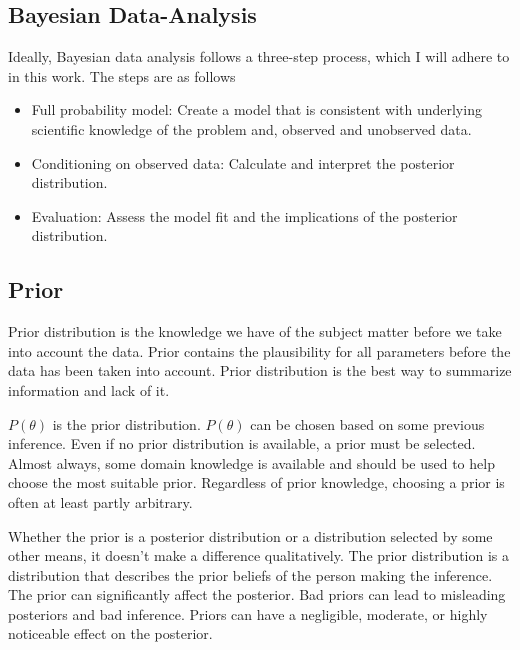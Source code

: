 \subsection{Bayesian Data-Analysis}
Ideally, Bayesian data analysis follows a three-step process, which I will adhere to in this work. The steps are as follows

\begin{itemize}
    \item Full probability model: Create a model that is consistent with underlying scientific knowledge of the problem and, observed and unobserved data. 
    \item Conditioning on observed data: Calculate and interpret the posterior distribution.
    \item Evaluation: Assess the model fit and the implications of the posterior distribution.
\end{itemize} \cite{Gel2014BayesianDA}

\subsection{Prior}\label{Prior}

Prior distribution is the knowledge we have of the subject matter before we take into account the data.\cite{Box1973BayesianII} Prior contains the plausibility for all parameters before the data has been taken into account. \cite{Mcelreath2015StatisticalRA}\cite{Robert2007TheBC} Prior distribution is the best way to summarize information and lack of it.\cite{Robert2007TheBC}


$P(\theta)$ is the prior distribution. $P(\theta)$ can be chosen based on some previous inference. Even if no prior distribution is available, a prior must be selected. Almost always, some domain knowledge is available and should be used to help choose the most suitable prior.\cite{Mcelreath2015StatisticalRA} Regardless of prior knowledge, choosing a prior is often at least partly arbitrary.\cite{Robert2007TheBC}

Whether the prior is a posterior distribution or a distribution selected by some other means, it doesn't make a difference qualitatively. The prior distribution is a distribution that describes the prior beliefs of the person making the inference.\cite{Lindley1990The1W} The prior can significantly affect the posterior. Bad priors can lead to misleading posteriors and bad inference.\cite{Mcelreath2015StatisticalRA} Priors can have a negligible, moderate, or highly noticeable effect on the posterior.\cite{Robert2007TheBC}

